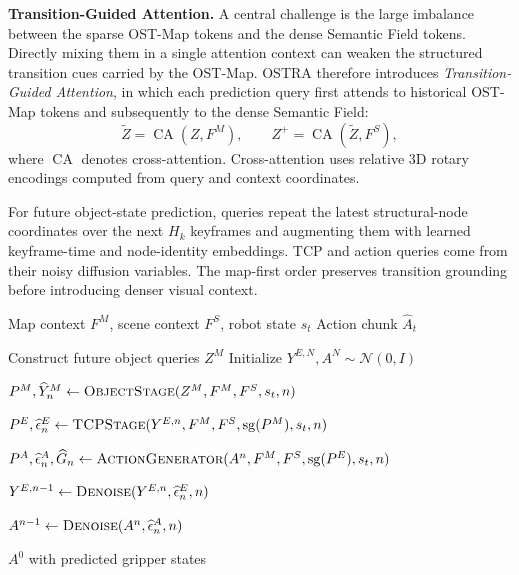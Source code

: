 \textbf{Transition-Guided Attention.}
A central challenge is the large imbalance between the sparse OST-Map tokens
and the dense Semantic Field tokens.
Directly mixing them in a single attention context can weaken the structured
transition cues carried by the OST-Map.
OSTRA therefore introduces \emph{Transition-Guided Attention}, in which each
prediction query first attends to historical OST-Map tokens and subsequently
to the dense Semantic Field:
\begin{equation}
    \widetilde{Z}
    =
    \operatorname{CA}(Z,F^{M}),
    \qquad
    Z^{+}
    =
    \operatorname{CA}(\widetilde{Z},F^{S}),
    \label{eq:tga}
\end{equation}
where $\operatorname{CA}$ denotes cross-attention.
Cross-attention uses relative 3D rotary encodings computed from query and
context coordinates.

For future object-state prediction, queries repeat the latest structural-node
coordinates over the next $H_k$ keyframes
and augmenting them with learned keyframe-time and node-identity embeddings.
TCP and action queries come from their noisy diffusion variables. The map-first
order preserves transition grounding before introducing denser visual context.



\begin{algorithm}[h]
\caption{Staged Action Generation in OSTRA}
\label{alg:ostra_generation}
\begin{algorithmic}[1]
\REQUIRE Map context $F^M$, scene context $F^S$, robot state $s_t$
\ENSURE Action chunk $\widehat{A}_t$

\STATE Construct future object queries $Z^M$
\STATE Initialize $Y^{E,N},A^N\sim\mathcal{N}(0,I)$

    \STATE $P^M,\widehat{Y}^M_n
    \leftarrow \textsc{ObjectStage}(Z^M,F^M,F^S,s_t,n)$

    \STATE $P^E,\widehat{\epsilon}^E_n
    \leftarrow \textsc{TCPStage}(Y^{E,n},F^M,F^S,\operatorname{sg}(P^M),s_t,n)$

    \STATE $P^A,\widehat{\epsilon}^A_n,\widehat{G}_n
    \leftarrow \textsc{ActionGenerator}(A^n,F^M,F^S,\operatorname{sg}(P^E),s_t,n)$

    \STATE $Y^{E,n-1}
    \leftarrow \textsc{Denoise}(Y^{E,n},\widehat{\epsilon}^E_n,n)$

    \STATE $A^{n-1}
    \leftarrow \textsc{Denoise}(A^n,\widehat{\epsilon}^A_n,n)$
\ENDFOR

\RETURN $A^0$ with predicted gripper states
\end{algorithmic}
\end{algorithm}
\vspace{-8pt}

